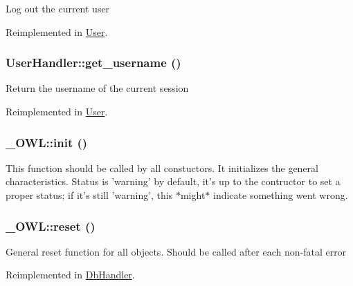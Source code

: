 Log out the current user 

Reimplemented in \hyperlink{classUser_06ed977c877b02b420233d4f18a6a668}{User}.\hypertarget{classUserHandler_76e8c8b88c8d92f2d03645e810b9253c}{
\subsubsection{\setlength{\rightskip}{0pt plus 5cm}UserHandler::get\_\-username ()}}
\label{classUserHandler_76e8c8b88c8d92f2d03645e810b9253c}


Return the username of the current session 

Reimplemented in \hyperlink{classUser_1348ddf190d4df2518665fb51305a902}{User}.\hypertarget{class__OWL_e0ef3ded56e8a6b34b6461e5a721cd3e}{
\subsubsection{\setlength{\rightskip}{0pt plus 5cm}\_\-OWL::init ()}}
\label{class__OWL_e0ef3ded56e8a6b34b6461e5a721cd3e}


This function should be called by all constuctors. It initializes the general characteristics. Status is 'warning' by default, it's up to the contructor to set a proper status; if it's still 'warning', this $\ast$might$\ast$ indicate something went wrong. \hypertarget{class__OWL_2f2a042bcf31965194c03033df0edc9b}{
\subsubsection{\setlength{\rightskip}{0pt plus 5cm}\_\-OWL::reset ()}}
\label{class__OWL_2f2a042bcf31965194c03033df0edc9b}


General reset function for all objects. Should be called after each non-fatal error 

Reimplemented in \hyperlink{classDbHandler_9982df4830f05803935bb31bac7fae3d}{DbHandler}.

